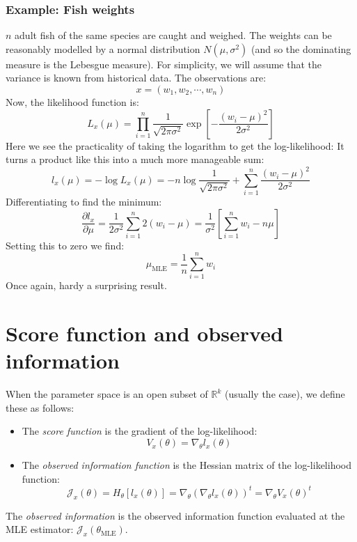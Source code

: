 \documentclass[12pt, a4paper]{article}
\numberwithin{equation}{section}
\begin{document}
\subsubsection{Example: Fish weights}
$n$ adult fish of the same species are caught and weighed. The weights can be reasonably modelled by a normal distribution $N(\mu,\sigma^2)$ (and so the dominating measure is the Lebesgue measure). For simplicity, we will assume that the variance is known from historical data. The observations are:
\begin{equation}
x=(w_1,w_2,\cdots,w_n)
\end{equation}
Now, the likelihood function is:
\begin{equation}
L_x(\mu)=\prod_{i=1}^n\frac{1}{\sqrt{2\pi\sigma^2}}\exp\left[-\frac{(w_i-\mu)^2}{2\sigma^2}\right]
\end{equation}
Here we see the practicality of taking the logarithm to get the log-likelihood: It turns a product like this into a much more manageable sum:
\begin{equation}
l_x(\mu)=-\log L_x(\mu)=-n\log\frac{1}{\sqrt{2\pi\sigma^2}}+\sum_{i=1}^n\frac{(w_i-\mu)^2}{2\sigma^2}
\end{equation}
Differentiating to find the minimum:
\begin{equation}
\frac{\partial l_x}{\partial\mu}=\frac{1}{2\sigma^2}\sum_{i=1}^n 2(w_i-\mu)=\frac{1}{\sigma^2}\left[\sum_{i=1}^n w_i-n\mu\right]
\end{equation}
Setting this to zero we find:
\begin{equation}
\mu_{\textrm{MLE}}=\frac{1}{n}\sum_{i=1}^n w_i
\end{equation}
Once again, hardy a surprising result.

\section{Score function and observed information}
When the parameter space is an open subset of $\mathbb{R}^k$ (usually the case), we define these as follows:
\begin{itemize}
\item The \textit{score function} is the gradient of the log-likelihood:
\begin{equation}
V_x(\theta)=\nabla_\theta l_x(\theta)
\end{equation}
\item The \textit{observed information function} is the Hessian matrix of the log-likelihood function:
\begin{equation}
\mathcal{J}_x(\theta)=H_\theta[l_x(\theta)]=\nabla_\theta(\nabla_\theta l_x(\theta))^t=\nabla_\theta V_x(\theta)^t
\end{equation}
\end{itemize}
The \textit{observed information} is the observed information function evaluated at the MLE estimator: $\mathcal{J}_x(\theta_{\textrm{MLE}})$.
\end{document}
